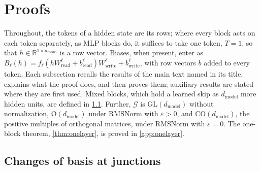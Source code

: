 \documentclass[10pt]{article}
\theoremstyle{definition}
\theoremstyle{remark}
\newcommand{\R}{\mathbb{R}}
\newcommand{\Wread}{W_{\mathrm{read}}}
\newcommand{\Wwrite}{W_{\mathrm{write}}}
\newcommand{\dm}{d_{\mathrm{model}}}
\newcommand{\GL}{\mathrm{GL}}
\newcommand{\Ort}{\mathrm{O}}
\newcommand{\CO}{\mathrm{CO}}
\newcommand{\G}{\mathcal{G}}
\begin{document}




\appendix
\section{Proofs}\label{app:proofs}

Throughout, the tokens of a hidden state are its rows; where every block acts on each token separately, as MLP blocks do, it suffices to take one token, $T = 1$, so that $h \in \R^{1\times\dm}$ is a row vector. Biases, when present, enter as $B_\ell(h) = f_\ell(h\Wread^{\ell} + b^{\ell}_{\mathrm{read}})\Wwrite^{\ell} + b^{\ell}_{\mathrm{write}}$, with row vectors $b$ added to every token. Each subsection recalls the results of the main text named in its title, explains what the proof does, and then proves them; auxiliary results are stated where they are first used. Mixed blocks, which hold a learned skip as $\dm$ more hidden units, are defined in \cref{app:prf-junction}. Further, $\G$ is $\GL(\dm)$ without normalization, $\Ort(\dm)$ under RMSNorm with $\varepsilon > 0$, and $\CO(\dm)$, the positive multiples of orthogonal matrices, under RMSNorm with $\varepsilon = 0$. The one-block theorem, \cref{thm:onelayer}, is proved in \cref{app:onelayer}.

\subsection{Changes of basis at junctions}\label{app:prf-junction}
\end{document}
